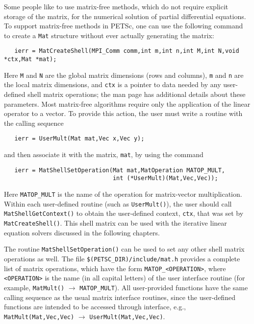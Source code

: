 \label{sec:matrixfree}
Some people like to use matrix-free methods, which do not require
explicit storage of the matrix, for the numerical solution of partial
differential equations.  To support matrix-free methods in PETSc, one
can use the following command to create a {\tt Mat} structure without
ever actually generating the matrix:
\begin{verbatim}
   ierr = MatCreateShell(MPI_Comm comm,int m,int n,int M,int N,void *ctx,Mat *mat);
\end{verbatim}
Here {\tt M} and {\tt N} are the global matrix dimensions (rows and
columns), {\tt m} and {\tt n} are the local matrix dimensions, and
{\tt ctx} is a pointer to data needed by any user-defined shell matrix
operations; the man page has additional details about these
parameters.  Most matrix-free algorithms require only the application
of the linear operator to a vector. To provide this action, the user
must write a routine with the calling sequence
\begin{verbatim}
   ierr = UserMult(Mat mat,Vec x,Vec y);
\end{verbatim}
and then associate it with the matrix, {\tt mat}, by using the 
command 
\begin{verbatim}
   ierr = MatShellSetOperation(Mat mat,MatOperation MATOP_MULT,
                               int (*UserMult)(Mat,Vec,Vec));
\end{verbatim}
Here {\tt MATOP\_MULT} is the name of the operation for matrix-vector
multiplication. Within each user-defined routine (such as
{\tt UserMult()}), the user should call 
{\tt MatShellGetContext()} to obtain the user-defined context, {\tt ctx},
that was set by {\tt MatCreateShell()}.
This shell matrix can be used with the iterative linear
equation solvers discussed in the following chapters.

The routine {\tt MatShellSetOperation()} can be used to set any other
shell matrix operations as well.  The file 
{\tt \$(PETSC\_DIR)/include/mat.h} provides a complete list of matrix
operations, which have the form {\tt MATOP\_<OPERATION>}, where {\tt
<OPERATION>} is the name (in all capital letters) of the user
interface routine (for example, {\tt MatMult()} $ \rightarrow $ {\tt MATOP\_MULT}).  All
user-provided functions have the same calling sequence as the
usual matrix interface routines, since the user-defined functions are
intended to be accessed through interface, e.g., 
{\tt MatMult(Mat,Vec,Vec)} $ \rightarrow$ {\tt UserMult(Mat,Vec,Vec)}.

